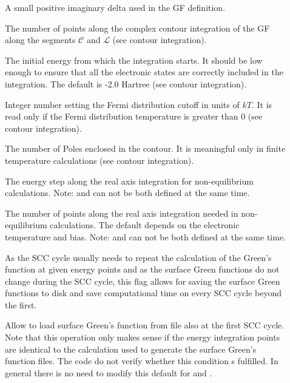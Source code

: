 \begin{description}
\item[] A small
  positive imaginary delta used in the GF definition.
  \item[] The number of points along the complex contour
    integration of the GF along the segments $\mathcal{C}$ and $\mathcal{L}$
    (see contour integration).
\item[] The
  initial energy from which the integration starts. It should be low enough to
  ensure that all the electronic states are correctly included in the
  integration. The default is -2.0 Hartree (see contour integration).
\item[] Integer number setting the Fermi distribution cutoff in
  units of $kT$. It is read only if the Fermi distribution temperature is
  greater than 0 (see contour integration).
\item[] The number of Poles enclosed in the contour. It is
  meaningful only in finite temperature calculations (see contour integration).
\item[] The energy step along the real
  axis integration for non-equilibrium calculations. Note:  and
   can not be both defined at the same time.

\item[] The number of points along the real axis integration
  needed in non-equilibrium calculations. The default depends on the electronic
  temperature and bias. Note:  and  can not
  be both defined at the same time.

\item[] As the SCC cycle usually needs to repeat the
  calculation of the Green's function at given energy points and as the surface
  Green functions do not change during the SCC cycle, this flag allows for
  saving the surface Green functions to disk and save computational time on
  every SCC cycle beyond the first.

\item[] Allow to load surface Green's function from file also
  at the first SCC cycle. Note that this operation only makes sense if the
  energy integration points are identical to the calculation used to generate
  the surface Green's function files. The code do not verify whether this
  condition s fulfilled. In general there is no need to modify this default for
   and .


\end{description}
